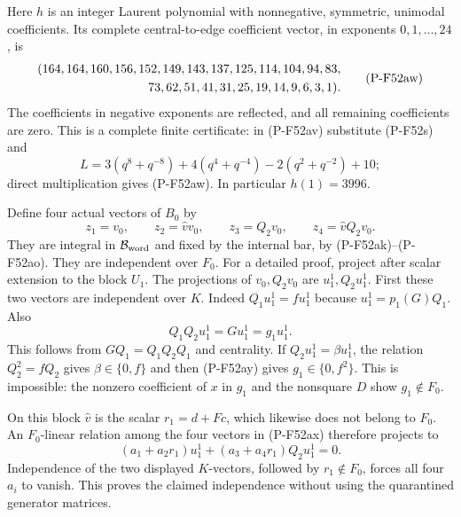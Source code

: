 Here $h$ is an integer Laurent polynomial with nonnegative,
symmetric, unimodal coefficients. Its complete central-to-edge
coefficient vector, in exponents $0,1,\ldots,24$, is
\[
 \begin{split}
 (164,164,160,156,152,149,143,137,125,114,104,94,83,\\
 \hspace{18mm}73,62,51,41,31,25,19,14,9,6,3,1).
 \end{split}                                                    \tag{P-F52aw}
\]
The coefficients in negative exponents are reflected, and
all remaining coefficients are zero. This is a complete
finite certificate: in (P-F52av) substitute (P-F52s) and
\[
       L=3(q^8+q^{-8})+4(q^4+q^{-4})
                        -2(q^2+q^{-2})+10;
\]
direct multiplication gives (P-F52aw). In particular
$h(1)=3996$.

Define four actual vectors of $B_0$ by
\[
  z_1=v_0,\qquad z_2=\widehat v v_0,\qquad
  z_3=Q_2v_0,\qquad z_4=\widehat v Q_2v_0.
                                                               \tag{P-F52ax}
\]
They are integral in $\mathcal B_{\rm word}$ and fixed by
the internal bar, by (P-F52ak)--(P-F52ao).
They are independent over $F_0$.
For a detailed proof, project after scalar extension to
the block $U_1$. The projections of $v_0,Q_2v_0$ are
$u_1^1,Q_2u_1^1$. First these two vectors are independent
over $K$. Indeed $Q_1u_1^1=fu_1^1$ because
$u_1^1=p_1(G)Q_1$. Also
\[
           Q_1Q_2u_1^1=Gu_1^1=g_1u_1^1.
                                                               \tag{P-F52ay}
\]
This follows from $GQ_1=Q_1Q_2Q_1$ and centrality.
If $Q_2u_1^1=\beta u_1^1$, the relation
$Q_2^2=fQ_2$ gives $\beta\in\{0,f\}$ and then
(P-F52ay) gives $g_1\in\{0,f^2\}$.
This is impossible: the nonzero coefficient of $x$ in
$g_1$ and the nonsquare $D$ show $g_1\notin F_0$.

On this block $\widehat v$ is the scalar
$r_1=d+Fc$, which likewise does not belong to $F_0$.
An $F_0$-linear relation among the four vectors in
(P-F52ax) therefore projects to
\[
       (a_1+a_2r_1)u_1^1+
                         (a_3+a_4r_1)Q_2u_1^1=0.
\]
Independence of the two displayed $K$-vectors, followed by
$r_1\notin F_0$, forces all four $a_i$ to vanish.
This proves the claimed independence without using the
quarantined generator matrices.

